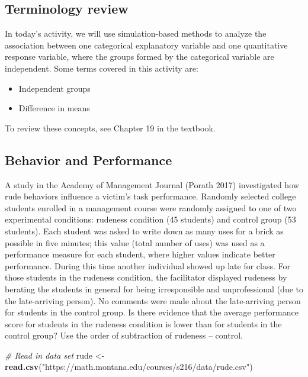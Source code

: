 \documentclass[
]{report}
\newenvironment{Shaded}{\begin{snugshade}}{\end{snugshade}}
\newcommand{\CommentTok}[1]{\textcolor[rgb]{0.56,0.35,0.01}{\textit{#1}}}
\newcommand{\FunctionTok}[1]{\textcolor[rgb]{0.13,0.29,0.53}{\textbf{#1}}}
\newcommand{\NormalTok}[1]{#1}
\newcommand{\OtherTok}[1]{\textcolor[rgb]{0.56,0.35,0.01}{#1}}
\newcommand{\StringTok}[1]{\textcolor[rgb]{0.31,0.60,0.02}{#1}}
\begin{document}
\subsection{Terminology review}\label{terminology-review-3}

In today's activity, we will use simulation-based methods to analyze the association between one categorical explanatory variable and one quantitative response variable, where the groups formed by the categorical variable are independent. Some terms covered in this activity are:

\begin{itemize}
\item
  Independent groups
\item
  Difference in means
\end{itemize}

To review these concepts, see Chapter 19 in the textbook.

\subsection{Behavior and Performance}\label{behavior-and-performance}

A study in the Academy of Management Journal (Porath 2017) investigated how rude behaviors influence a victim's task performance. Randomly selected college students enrolled in a management course were randomly assigned to one of two experimental conditions: rudeness condition (45 students) and control group (53 students). Each student was asked to write down as many uses for a brick as possible in five minutes; this value (total number of uses) was used as a performance measure for each student, where higher values indicate better performance. During this time another individual showed up late for class. For those students in the rudeness condition, the facilitator displayed rudeness by berating the students in general for being irresponsible and unprofessional (due to the late-arriving person). No comments were made about the late-arriving person for students in the control group. Is there evidence that the average performance score for students in the rudeness condition is lower than for students in the control group? Use the order of subtraction of rudeness -- control.

\begin{Shaded}
\begin{Highlighting}[]
\CommentTok{\# Read in data set}
\NormalTok{rude }\OtherTok{\textless{}{-}} \FunctionTok{read.csv}\NormalTok{(}\StringTok{"https://math.montana.edu/courses/s216/data/rude.csv"}\NormalTok{)}
\end{Highlighting}
\end{Shaded}
\end{document}
